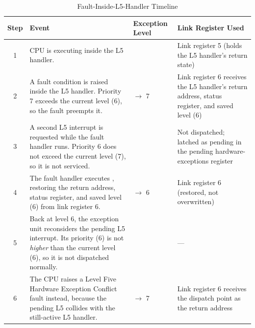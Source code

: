 \begin{table}[H]
	\centering
	\begin{tabularx}{\textwidth}{c>{\raggedright\arraybackslash}p{4cm}>{\raggedright\arraybackslash}p{2.3cm}>{\raggedright\arraybackslash}X}
		\toprule
		\textbf{Step} & \textbf{Event}                                                                                                                                                                  & \textbf{Exception Level} & \textbf{Link Register Used}                                                                    \\
		\midrule
		1             & CPU is executing inside the L5 handler.                                                                                                                                         & 6                        & Link register 5 (holds the L5 handler's return state)                                          \\
		2             & A fault condition is raised inside the L5 handler. Priority 7 exceeds the current level (6), so the fault preempts it.                                                          & 6 $\rightarrow$ 7        & Link register 6 receives the L5 handler's return address, status register, and saved level (6) \\
		3             & A second L5 interrupt is requested while the fault handler runs. Priority 6 does not exceed the current level (7), so it is not serviced.                                       & 7                        & Not dispatched; latched as pending in the pending hardware-exceptions register                 \\
		4             & The fault handler executes \mnemonic{RETE}, restoring the return address, status register, and saved level (6) from link register 6.                                            & 7 $\rightarrow$ 6        & Link register 6 (restored, not overwritten)                                                    \\
		5             & Back at level 6, the exception unit reconsiders the pending L5 interrupt. Its priority (6) is not \textit{higher} than the current level (6), so it is not dispatched normally. & 6                        & ---                                                                                            \\
		6             & The CPU raises a Level Five Hardware Exception Conflict fault instead, because the pending L5 collides with the still-active L5 handler.                                        & 6 $\rightarrow$ 7        & Link register 6 receives the dispatch point as the return address                              \\
		\bottomrule
	\end{tabularx}
	\caption{Fault-Inside-L5-Handler Timeline}
	\label{tab:l5-fault-timeline}
\end{table}

